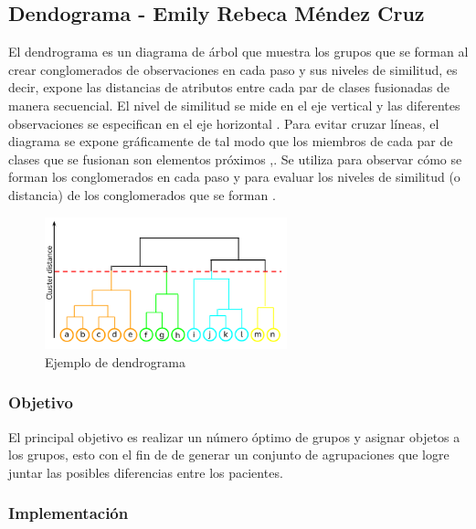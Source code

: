 \documentclass[journal]{IEEEtran}
\begin{document}
            
        \subsection{Dendograma - Emily Rebeca Méndez Cruz} \label{dendrogram}
        
            El dendrograma es un diagrama de árbol que muestra los grupos que se forman al crear conglomerados de observaciones en cada paso y sus niveles de similitud, es decir,  expone las distancias de atributos entre cada par de clases fusionadas de manera secuencial. El nivel de similitud se mide en el eje vertical y las diferentes observaciones se especifican en el eje horizontal \cite{minitab}. Para evitar cruzar líneas, el diagrama se expone gráficamente de tal modo que los miembros de cada par de clases que se fusionan son elementos próximos ,\cite{desktop}.
            Se utiliza para observar cómo se forman los conglomerados en cada paso y para evaluar los niveles de similitud (o distancia) de los conglomerados que se forman \cite{minitab}. 
            
            \begin{figure}[h!]
                \centering
                \includegraphics[width=7cm]{img/dendrograma.png}
                \caption{Ejemplo de dendrograma}
            \end{figure}
    
            \subsubsection{Objetivo}
            
                El principal objetivo es realizar un número óptimo de grupos y asignar objetos a los grupos, esto con el fin de de generar un conjunto de agrupaciones que logre juntar las posibles diferencias entre los pacientes.
            
            \subsubsection{Implementación}
            
\end{document}

